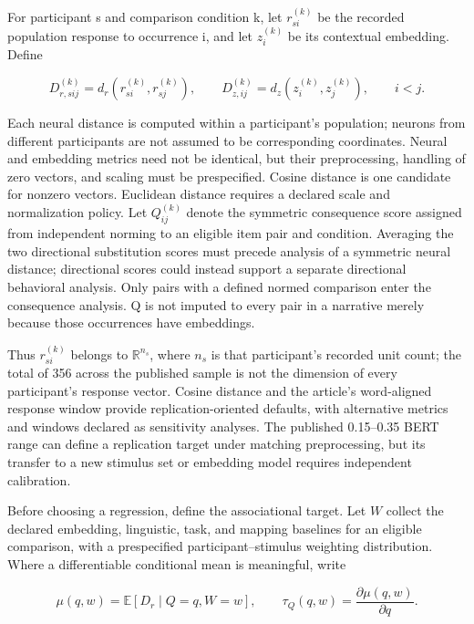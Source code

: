 \documentclass[11pt]{article}
\begin{document}
For participant s and comparison condition k, let \(r_{si}^{(k)}\) be
the recorded population response to occurrence i, and let \(z_i^{(k)}\)
be its contextual embedding. Define

\begin{equation}
D_{r,sij}^{(k)}=d_r(r_{si}^{(k)},r_{sj}^{(k)}),\qquad
D_{z,ij}^{(k)}=d_z(z_i^{(k)},z_j^{(k)}),\qquad i<j.
\end{equation}

Each neural distance is computed within a participant's population;
neurons from different participants are not assumed to be corresponding
coordinates. Neural and embedding metrics need not be identical, but
their preprocessing, handling of zero vectors, and scaling must be
prespecified. Cosine distance is one candidate for nonzero vectors.
Euclidean distance requires a declared scale and normalization policy.
Let \(Q_{ij}^{(k)}\) denote the symmetric consequence score assigned
from independent norming to an eligible item pair and condition.
Averaging the two directional substitution scores must precede analysis
of a symmetric neural distance; directional scores could instead support
a separate directional behavioral analysis. Only pairs with a defined
normed comparison enter the consequence analysis. Q is not imputed to
every pair in a narrative merely because those occurrences have
embeddings.

Thus \(r_{si}^{(k)}\) belongs to \(\mathbb{R}^{n_s}\), where \(n_s\) is
that participant's recorded unit count; the total of 356 across the
published sample is not the dimension of every participant's response
vector. Cosine distance and the article's word-aligned response window
provide replication-oriented defaults, with alternative metrics and
windows declared as sensitivity analyses. The published 0.15--0.35 BERT
range can define a replication target under matching preprocessing, but
its transfer to a new stimulus set or embedding model requires
independent calibration.

Before choosing a regression, define the associational target. Let \(W\)
collect the declared embedding, linguistic, task, and mapping baselines
for an eligible comparison, with a prespecified participant--stimulus
weighting distribution. Where a differentiable conditional mean is
meaningful, write

\begin{equation}
\mu(q,w)=\mathbb E[D_r\mid Q=q,W=w],\qquad
\tau_Q(q,w)=\frac{\partial\mu(q,w)}{\partial q}.
\end{equation}
\end{document}
